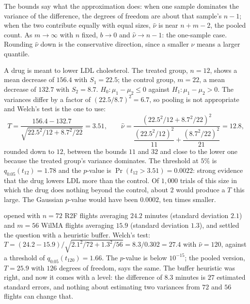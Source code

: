 The bounds say what the approximation does: when one sample dominates the variance of the difference, the degrees of freedom are about that sample's $n - 1$; when the two contribute equally with equal sizes, $\hat{\nu}$ is near $n + m - 2$, the pooled count.
As $m \to \infty$ with $n$ fixed, $b \to 0$ and $\hat{\nu} \to n - 1$: the one-sample case.
Rounding $\hat{\nu}$ down is the conservative direction, since a smaller $\nu$ means a larger quantile.

\begin{worked}
A drug is meant to lower LDL cholesterol.
The treated group, $n = 12$, shows a mean decrease of $156.4$ with $S_1 = 22.5$; the control group, $m = 22$, a mean decrease of $132.7$ with $S_2 = 8.7$.
$H_0: \mu_1 - \mu_2 \leq 0$ against $H_1: \mu_1 - \mu_2 > 0$.
The variances differ by a factor of $(22.5/8.7)^2 = 6.7$, so pooling is not appropriate and Welch's test is the one to use:
\[
T = \frac{156.4 - 132.7}{\sqrt{22.5^2/12 + 8.7^2/22}} = 3.51, \qquad \hat{\nu} = \frac{(22.5^2/12 + 8.7^2/22)^2}{\dfrac{(22.5^2/12)^2}{11} + \dfrac{(8.7^2/22)^2}{21}} = 12.8,
\]
rounded down to $12$, between the bounds $11$ and $32$ and close to the lower one because the treated group's variance dominates.
The threshold at $5\%$ is $q_{0.05}(t_{12}) = 1.78$ and the $p$-value is $\Pr(t_{12} > 3.51) = 0.0022$: strong evidence that the drug lowers LDL more than the control.
Of $1{,}000$ trials of this size in which the drug does nothing beyond the control, about $2$ would produce a $T$ this large.
The Gaussian $p$-value would have been $0.0002$, ten times smaller.
\end{worked}

\begin{worked}
 opened with $n = 72$ R2F flights averaging $24.2$ minutes (standard deviation $2.1$) and $m = 56$ WilMA flights averaging $15.9$ (standard deviation $1.3$), and settled the question with a heuristic buffer.
Welch's test: $T = (24.2 - 15.9)/\sqrt{2.1^2/72 + 1.3^2/56} = 8.3/0.302 = 27.4$ with $\hat{\nu} = 120$, against a threshold of $q_{0.05}(t_{120}) = 1.66$.
The $p$-value is below $10^{-15}$; the pooled version, $T = 25.9$ with $126$ degrees of freedom, says the same.
The buffer heuristic was right, and now it comes with a level: the difference of $8.3$ minutes is $27$ estimated standard errors, and nothing about estimating two variances from $72$ and $56$ flights can change that.
\end{worked}

